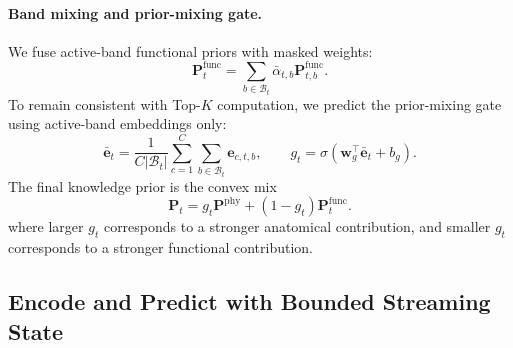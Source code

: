 \documentclass[preprint,12pt]{elsarticle}
\begin{document}
\paragraph{Band mixing and prior-mixing gate.}
We fuse active-band functional priors with masked weights:
\begin{equation}
\mathbf{P}^{\mathrm{func}}_t
=
\sum_{b\in\mathcal{B}_t}\bar{\alpha}_{t,b}\mathbf{P}^{\mathrm{func}}_{t,b}.
\label{eq:masked_fusion}
\end{equation}
To remain consistent with Top-$K$ computation, we predict the prior-mixing gate using active-band embeddings only:
\begin{equation}
\bar{\mathbf{e}}_t
=
\frac{1}{C|\mathcal{B}_t|}\sum_{c=1}^{C}\sum_{b\in\mathcal{B}_t}\mathbf{e}_{c,t,b},
\qquad
g_t
=
\sigma\!\left(\mathbf{w}_g^\top\bar{\mathbf{e}}_t+b_g\right).
\label{eq:gate}
\end{equation}
The final knowledge prior is the convex mix
\begin{equation}
\mathbf{P}_t
=
g_t\mathbf{P}^{\mathrm{phy}} + (1-g_t)\mathbf{P}^{\mathrm{func}}_t.
\label{eq:gate_fusion_method}
\end{equation}
where larger $g_t$ corresponds to a stronger anatomical contribution,
and smaller $g_t$ corresponds to a stronger functional contribution.

\subsection{Encode and Predict with Bounded Streaming State}
\label{sec:method_encode}
\end{document}
